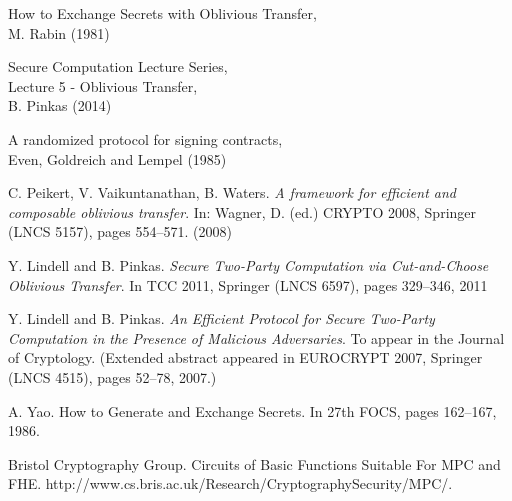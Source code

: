 \documentclass[a4paper,11pt]{article}
\begin{document}
\begin{thebibliography}{5}
			How to Exchange Secrets with Oblivious Transfer,\\
			M. Rabin (1981)

			Secure Computation Lecture Series,\\
			Lecture 5 - Oblivious Transfer,\\
			B. Pinkas (2014)

			A randomized protocol for signing contracts,\\
			Even, Goldreich and Lempel (1985)

 			C. Peikert, V. Vaikuntanathan, B. Waters. \emph{A framework for efficient and composable oblivious transfer}. In: Wagner, D. (ed.) CRYPTO 2008, Springer (LNCS 5157), pages 554–571. (2008)

			Y. Lindell and B. Pinkas. \emph{Secure Two-Party Computation via Cut-and-Choose Oblivious Transfer}. In TCC 2011, Springer (LNCS 6597), pages 329–346, 2011
			
			Y. Lindell and B. Pinkas. \emph{An Efficient Protocol for Secure Two-Party Computation in the Presence of Malicious Adversaries}. To appear in the Journal of Cryptology. (Extended abstract appeared in EUROCRYPT 2007, Springer (LNCS 4515), pages 52–78, 2007.)

			A. Yao. How to Generate and Exchange Secrets. In 27th FOCS, pages 162–167, 1986.

			Bristol Cryptography Group. Circuits of Basic Functions Suitable For MPC and FHE. http://www.cs.bris.ac.uk/Research/CryptographySecurity/MPC/. 

	\end{thebibliography}
\end{document}
